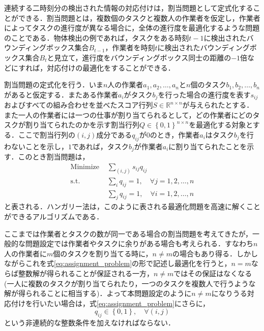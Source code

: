     連続する二時刻分の検出された情報の対応付けは，割当問題として定式化することができる．割当問題とは，複数個のタスクと複数人の作業者を仮定し，作業者によってタスクの進行度が異なる場合に，全体の進行度を最適化するような問題のことである．物体検出の例であれば，タスクをある時刻$t-1$に検出されたバウンディングボックス集合$B_{t-1}$，作業者を時刻$t$に検出されたバウンディングボックス集合$B_{t}$と見立て，進行度をバウンディングボックス同士の距離の$-1$倍などにすれば，対応付けの最適化をすることができる．

    割当問題の定式化を行う．いま$n$人の作業者$a_1, a_2, \dots, a_n$と$n$個のタスク$b_1, b_2, \dots, b_n$があると仮定する．またある作業者$a_i$がタスク$b_j$を行った場合の進行度を表す$s_{ij}$およびすべての組み合わせを並べたスコア行列$S \in \mathbb{R}^{n \times n}$が与えられたとする．また一人の作業者には一つの仕事が割り当てられるとして，どの作業者にどのタスクが割り当てられたのかを示す割当行列$Q \in \left\{0, 1\right\}^{n \times n}$を最適化する対象とする．ここで割当行列の$(i,j)$成分である$q_{ij}$が$0$のとき，作業者$a_i$はタスク$b_j$を行わないことを示し，$1$であれば，タスク$b_j$が作業者$a_i$に割り当てられたことを示す．このとき割当問題は，
    \begin{equation}
        \label{eq:assignment_problem}
        \begin{aligned}
            \text{Minimize }& \sum _{(i, j)} s_{ij} q_{ij}  
            \\ \text{s.t. }& \sum_i q_{ij} = 1,\quad \forall j = 1, 2, \dots, n
            \\ \phantom{\text{s.t.} }& \sum_j q_{ij} = 1,\quad \forall i = 1,2,\dots, n
        \end{aligned}
    \end{equation}
    と表される．ハンガリー法\cite{kuhn1955hungarian}は，このように表される最適化問題を高速に解くことができるアルゴリズムである．

    ここまでは作業者とタスクの数が同一である場合の割当問題を考えてきたが，一般的な問題設定では作業者やタスクに余りがある場合も考えられる．すなわち$n$人の作業者に$m$個のタスクを割り当てる時に，$n \neq m$の場合もあり得る．しかしながらこれを式\ref{eq:assignment_problem}の形で記述し最適化を行うと，$n=m$ならば整数解が得られることが保証される一方，$n\neq m$ではその保証はなくなる (一人に複数のタスクが割り当てられたり，一つのタスクを複数人で行うような解が得られることに相当する)．よって本問題設定のように$n \neq m$になりうる対応付けを行いたい場合は，式\ref{eq:assignment_problem}にさらに，
    \begin{equation}
        \label{eq:intger_assignment_constraint}
        q_{ij} \in \left\{0, 1\right\}, \quad \forall (i,j)
    \end{equation}
    という非連続的な整数条件を加えなければならない．

